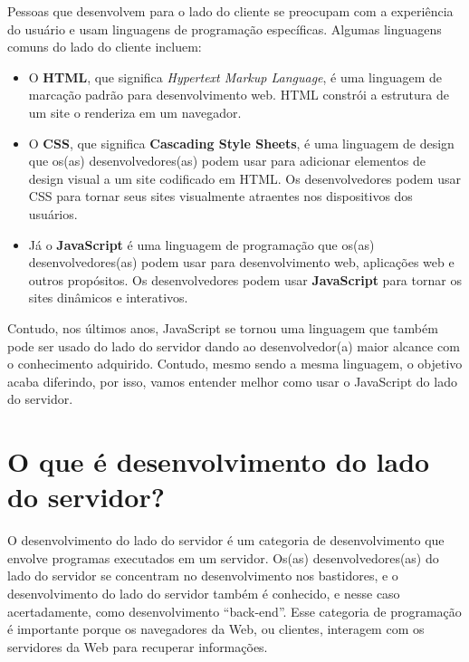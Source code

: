 Pessoas que desenvolvem para o lado do cliente se preocupam com a experiência do usuário e usam linguagens de programação específicas. Algumas linguagens comuns do lado do cliente incluem:

\begin{itemize}[leftmargin=1.7cm]
	\setlength\itemsep{0em}
	\item  O \textbf{HTML}, que significa\textit{ Hypertext Markup Language}, é uma linguagem de marcação padrão para desenvolvimento web. HTML constrói a estrutura de um site o renderiza em um navegador.
	
	\item O \textbf{CSS}, que significa \textbf{Cascading Style Sheets}, é uma linguagem de design que os(as) desenvolvedores(as) podem usar para adicionar elementos de design visual a um site codificado em HTML. Os desenvolvedores podem usar CSS para tornar seus sites visualmente atraentes nos dispositivos dos usuários.
	
	\item Já o \textbf{JavaScript} é uma linguagem de programação que os(as) desenvolvedores(as) podem usar para desenvolvimento web, aplicações web e outros propósitos. Os\textbf{} desenvolvedores\textbf{} podem usar \textbf{JavaScript} para tornar os sites dinâmicos e interativos. 
\end{itemize}

Contudo, nos últimos anos, JavaScript se tornou uma linguagem que também pode ser usado do lado do servidor dando ao desenvolvedor(a) maior alcance com o conhecimento adquirido. Contudo, mesmo sendo a mesma linguagem, o objetivo acaba diferindo, por isso, vamos entender melhor como usar o JavaScript do lado do servidor. 

\section{O que é desenvolvimento do lado do servidor?}

O desenvolvimento do lado do servidor é um categoria de desenvolvimento que envolve programas executados em um servidor. Os(as) desenvolvedores(as) do lado do servidor se concentram no desenvolvimento nos bastidores, e o desenvolvimento do lado do servidor também é conhecido, e nesse caso acertadamente, como desenvolvimento ``back-end''. Esse categoria de programação é importante porque os navegadores da Web, ou clientes, interagem com os servidores da Web para recuperar informações. 

